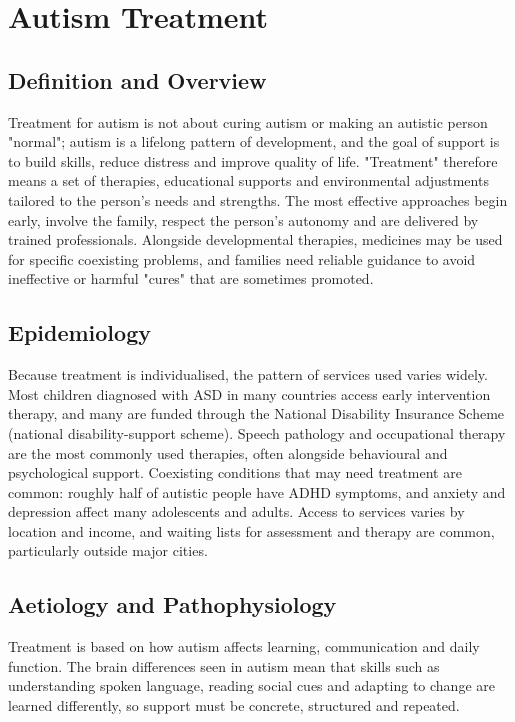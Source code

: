 \chapter{Autism Treatment}

\section*{Definition and Overview}
Treatment for autism is not about curing autism or making an autistic person "normal"; autism is a lifelong pattern of development, and the goal of support is to build skills, reduce distress and improve quality of life. "Treatment" therefore means a set of therapies, educational supports and environmental adjustments tailored to the person's needs and strengths. The most effective approaches begin early, involve the family, respect the person's autonomy and are delivered by trained professionals. Alongside developmental therapies, medicines may be used for specific coexisting problems, and families need reliable guidance to avoid ineffective or harmful "cures" that are sometimes promoted.

\section*{Epidemiology}
Because treatment is individualised, the pattern of services used varies widely. Most children diagnosed with ASD in many countries access early intervention therapy, and many are funded through the National Disability Insurance Scheme (national disability-support scheme). Speech pathology and occupational therapy are the most commonly used therapies, often alongside behavioural and psychological support. Coexisting conditions that may need treatment are common: roughly half of autistic people have ADHD symptoms, and anxiety and depression affect many adolescents and adults. Access to services varies by location and income, and waiting lists for assessment and therapy are common, particularly outside major cities.

\section*{Aetiology and Pathophysiology}
Treatment is based on how autism affects learning, communication and daily function. The brain differences seen in autism mean that skills such as understanding spoken language, reading social cues and adapting to change are learned differently, so support must be concrete, structured and repeated.

